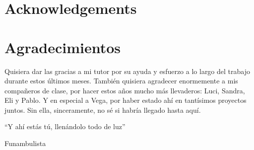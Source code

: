 %
%
%
% 
%
%
%
%

\thispagestyle{empty}

{
  \chapter*{Acknowledgements}
  \label{cha:acknowledgements}
}
{
  \chapter*{Agradecimientos}
  \label{cha:agradecimientos}
}




Quisiera dar las gracias a mi tutor por su ayuda y esfuerzo a lo largo del trabajo durante estos últimos meses. También quisiera 
agradecer enormemente a mis compañeros de clase, por hacer estos años mucho más llevaderos: Luci, Sandra, Eli y Pablo. Y en 
especial a Vega, por haber estado ahí en tantísimos proyectos juntos. Sin ella, sinceramente, no sé si habría llegado hasta aquí.

\begin{FraseCelebre}
  \begin{Frase}
    ``Y ahí estás tú,
    llenándolo todo de luz''
  \end{Frase}
  \begin{Fuente}
    Funambulista
  \end{Fuente}
\end{FraseCelebre}




